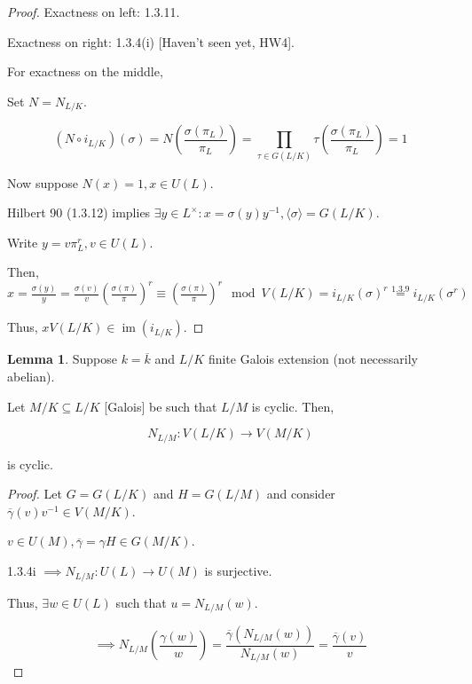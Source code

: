 \documentclass{article}
\theoremstyle{definition}
\numberwithin{theorem}{subsection}
\newtheorem{lemma}[theorem]{Lemma}
\begin{document}
    \begin{proof}
        Exactness on left: 1.3.11.

        Exactness on right: 1.3.4(i) [Haven't seen yet, HW4].

        For exactness on the middle,

        Set \(N = N_{L / K}\).

        \[
            (N \circ i_{L / K})(\sigma) = N \left( \frac{\sigma(\pi_L)}{\pi_L}\right) = \prod_{\tau \in G(L / K)} \tau \left( \frac{\sigma(\pi_L)}{\pi_L} \right) = 1  
        \]

        Now suppose \(N(x) = 1, x \in U(L)\).

        Hilbert 90 (1.3.12) implies \(\exists y\in L^\times \colon x = \sigma(y) y ^{-1}, \langle \sigma \rangle = G(L / K)\).
        
        Write \(y = v \pi_L^r, v\in U(L)\).
        
        Then, \(x = \frac{\sigma(y)}{y} = \frac{\sigma(v)}{v} \left( \frac{\sigma(\pi)}{\pi} \right)^r \equiv \left( \frac{\sigma(\pi)}{\pi} \right)^r \mod V(L / K) = i_{L / K}(\sigma)^r \overset{1.3.9}{=} i_{L / K}(\sigma^r)\) 

        Thus, \(x V(L / K) \in \operatorname{im} (i_{L / K})\).
        
    \end{proof}

    \begin{lemma}
        Suppose \(k = \overline{k}\) and \(L / K\) finite Galois extension (not necessarily abelian).

        Let \(M / K \subseteq L / K\) [Galois] be such that \(L / M\) is cyclic. Then,
        
        \[
            N_{L / M}: V(L / K) \to V(M / K)
        \]

        is cyclic.
    \end{lemma}

    \begin{proof}
        Let \(G=G(L / K)\) and \(H = G(L / M)\) and consider \(\overline{\gamma} (v) v ^{-1} \in V(M / K)\).

        \(v \in U(M), \overline{\gamma} = \gamma H \in G(M / K)\).
        
        1.3.4i \(\implies N_{L / M}: U(L) \to U(M)\) is surjective.

        Thus, \(\exists w \in U(L)\) such that \(u = N_{L / M}(w)\).

        \[
            \implies N_{L / M} \left( \frac{\gamma(w)}{w} \right) = \frac{\overline{\gamma}(N_{L / M}(w))}{N_{L / M}(w)} = \frac{\overline{\gamma}(v)}{v}
        \] 
    \end{proof}
\end{document}

